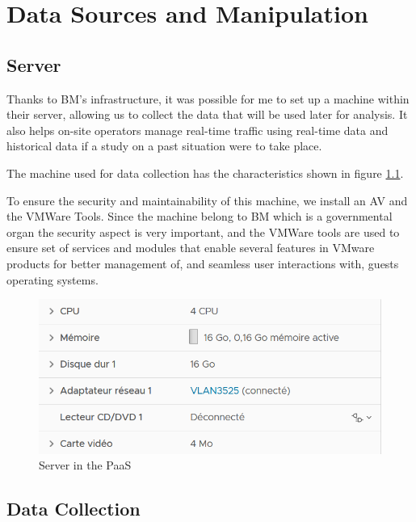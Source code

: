 \documentclass[12pt]{report}
\begin{document}
	
	\chapter{Data Sources and Manipulation}
	
	\section{Server}
	
	Thanks to BM's infrastructure, it was possible for me to set up a machine within their server, allowing us to collect the data that will be used later for analysis. It also helps on-site operators manage real-time traffic using real-time data and historical data if a study on a past situation were to take place.
	
	The machine used for data collection has the characteristics shown in figure \ref{server}.
	
	To ensure the security and maintainability of this machine, we install an AV and the VMWare Tools. Since the machine belong to BM which is a governmental organ the security aspect is very important, and the VMWare tools are used to ensure set of services and modules that enable several features in VMware products for better management of, and seamless user interactions with, guests operating systems.
	
	
	
	
	\begin{figure}
		\begin{center}
			\includegraphics{images/CaracVM.png}
			\caption{Server in the PaaS}
			\label{server}
		\end{center}
	\end{figure}
	
	\section{Data Collection}
	
\end{document}
